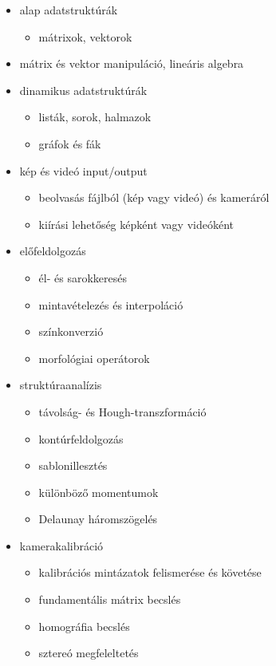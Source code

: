 \begin{itemize}

 \item alap adatstruktúrák
  \begin{itemize}
   \item mátrixok, vektorok
  \end{itemize} 

 \item mátrix és vektor manipuláció, lineáris algebra
  
 \item dinamikus adatstruktúrák
  \begin{itemize}
   \item listák, sorok, halmazok
   \item gráfok és fák
  \end{itemize}

 \item kép és videó input/output
  \begin{itemize}
   \item beolvasás fájlból (kép vagy videó) és kameráról
   \item kiírási lehetőség képként vagy videóként
  \end{itemize}

 \item előfeldolgozás
  \begin{itemize}
   \item él- és sarokkeresés
   \item mintavételezés és interpoláció
   \item színkonverzió
   \item morfológiai operátorok
  \end{itemize}

 \item struktúraanalízis
  \begin{itemize}
   \item távolság- és Hough-transzformáció
   \item kontúrfeldolgozás
   \item sablonillesztés
   \item különböző momentumok
   \item Delaunay háromszögelés
  \end{itemize}

 \item kamerakalibráció
  \begin{itemize}
   \item kalibrációs mintázatok felismerése és követése
   \item fundamentális mátrix becslés
   \item homográfia becslés
   \item sztereó megfeleltetés
  \end{itemize}
  

\end{itemize}
